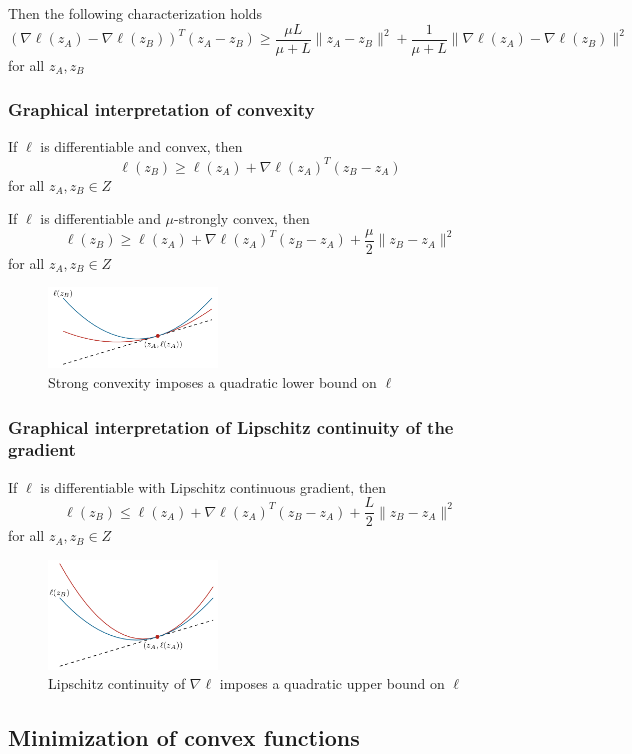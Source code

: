 \documentclass[openany]{book}
\theoremstyle{definition}
\theoremstyle{remark}
\begin{document}
Then the following characterization holds
\[
    (\nabla\ell(z_A) - \nabla\ell(z_B))^T(z_A - z_B) \geq \frac{\mu L}{\mu+L}\|z_A - z_B\|^2 + \frac{1}{\mu+L}\|\nabla\ell(z_A) - \nabla\ell(z_B)\|^2
\]
for all $z_A, z_B$

\subsubsection{Graphical interpretation of convexity}
If $\ell$ is differentiable and convex, then
\[
    \ell(z_B) \geq \ell(z_A) + \nabla\ell(z_A)^T(z_B - z_A)
\]
for all $z_A, z_B \in Z$

If $\ell$ is differentiable and $\mu$-strongly convex, then
\[
    \ell(z_B) \geq \ell(z_A) + \nabla\ell(z_A)^T(z_B - z_A) + \frac{\mu}{2}\|z_B - z_A\|^2
\]
for all $z_A, z_B \in Z$
\begin{figure}[ht]
    \centering
    \includegraphics[width=0.4\textwidth]{quadratic lower bound on l}
    \caption{Strong convexity imposes a quadratic lower bound on $\ell$}
\end{figure}

\subsubsection{Graphical interpretation of Lipschitz continuity of the gradient}
If $\ell$ is differentiable with Lipschitz continuous gradient, then
\[
    \ell(z_B) \leq \ell(z_A) + \nabla\ell(z_A)^T(z_B - z_A) + \frac{L}{2}\|z_B - z_A\|^2
\]
for all $z_A, z_B \in Z$
\begin{figure}[ht]
    \centering
    \includegraphics[width=0.4\textwidth]{quadratic upper bound on l}
    \caption{Lipschitz continuity of $\nabla\ell$ imposes a quadratic upper bound on $\ell$}
\end{figure}

\subsection{Minimization of convex functions}
\end{document}
